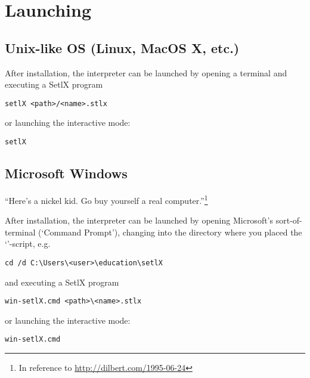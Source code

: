 \section{Launching}

\subsection{Unix-like OS (Linux, MacOS X, etc.)}

After installation, the \setlX{} interpreter can be launched by opening a terminal and executing a SetlX program

\begin{lstlisting}[frame=none,numbers=none]
setlX <path>/<name>.stlx
\end{lstlisting}

or launching the interactive mode:

\begin{lstlisting}[frame=none,numbers=none]
setlX
\end{lstlisting}

\subsection{Microsoft Windows}

\begin{center}
\large
``Here's a nickel kid. Go buy yourself a real computer.''\footnote{In reference to \url{http://dilbert.com/1995-06-24}}
\end{center}

After installation, the \setlX{} interpreter can be launched by opening Microsoft's sort-of-terminal (`Command Prompt'), changing into the directory where you placed the `'-script, e.g.

\begin{lstlisting}[frame=none,numbers=none]
cd /d C:\Users\<user>\education\setlX
\end{lstlisting}

and executing a SetlX program

\begin{lstlisting}[frame=none,numbers=none]
win-setlX.cmd <path>\<name>.stlx
\end{lstlisting}

or launching the interactive mode:

\begin{lstlisting}[frame=none,numbers=none]
win-setlX.cmd
\end{lstlisting}

